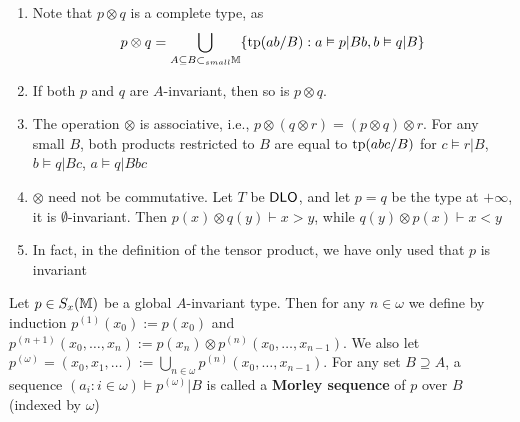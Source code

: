\documentclass[11pt]{article}
\begin{document}
\begin{remark}
\begin{enumerate}
\item Note that \(p\otimes q\) is a complete type, as
\begin{equation*}
p\otimes q=\bigcup_{A\subseteq B\subset_{small}\mathbb{M}}\{\operatorname{tp}(ab/B):a\vDash p|Bb,b\vDash q|B\}
\end{equation*}
\item If both \(p\) and \(q\) are \(A\)-invariant, then so is \(p\otimes q\).
\item The operation \(\otimes\) is associative, i.e., \(p\otimes(q\otimes r)=(p\otimes q)\otimes r\). For any small \(B\), both
products restricted to \(B\) are equal to \(\operatorname{tp}(abc/B)\)
for \(c\vDash r|B\), \(b\vDash q|Bc\), \(a\vDash q|Bbc\)
\item \(\otimes\) need not be commutative. Let \(T\) be \(\operatorname{\textsf{DLO}}\), and let \(p=q\) be the type at \(+\infty\),
it is \(\emptyset\)-invariant. Then \(p(x)\otimes q(y)\vdash x>y\), while \(q(y)\otimes p(x)\vdash x<y\)
\item In fact, in the definition of the tensor product, we have only used that \(p\) is invariant
\end{enumerate}
\end{remark}

\begin{definition}[]
Let \(p\in S_x(\mathbb{M})\) be a global \(A\)-invariant type. Then for any \(n\in\omega\) we define by
induction \(p^{(1)}(x_0):=p(x_0)\) and \(p^{(n+1)}(x_0,\dots,x_n):=p(x_n)\otimes p^{(n)}(x_0,\dots,x_{n-1})\).
We also let \(p^{(\omega)}=(x_0,x_1,\dots):=\bigcup_{n\in\omega}p^{(n)}(x_0,\dots,x_{n-1})\). For any set \(B\supseteq A\), a
sequence \((a_i:i\in\omega)\vDash p^{(\omega)}|B\) is called a \textbf{Morley sequence} of \(p\) over \(B\) (indexed by \(\omega\))
\end{definition}
\end{document}

